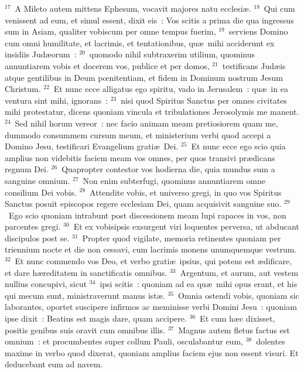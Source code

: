 ${}^{17}$~A Mileto autem mittens Ephesum, vocavit majores natu ecclesi\ae .
${}^{18}$~Qui cum venissent ad eum, et simul essent, dixit eis~: Vos scitis a prima die qua ingressus sum in Asiam, qualiter vobiscum per omne tempus fuerim,
${}^{19}$~serviens Domino cum omni humilitate, et lacrimis, et tentationibus, qu\ae\ mihi acciderunt ex insidiis Jud\ae orum~:
${}^{20}$~quomodo nihil subtraxerim utilium, quominus annuntiarem vobis et docerem vos, publice et per domos,
${}^{21}$~testificans Jud\ae is atque gentilibus in Deum pœnitentiam, et fidem in Dominum nostrum Jesum Christum.
${}^{22}$~Et nunc ecce alligatus ego spiritu, vado in Jerusalem~: qu\ae\ in ea ventura sint mihi, ignorans~:
${}^{23}$~nisi quod Spiritus Sanctus per omnes civitates mihi protestatur, dicens quoniam vincula et tribulationes Jerosolymis me manent.
${}^{24}$~Sed nihil horum vereor~: nec facio animam meam pretiosiorem quam me, dummodo consummem cursum meum, et ministerium verbi quod accepi a Domino Jesu, testificari Evangelium grati\ae\ Dei.
${}^{25}$~Et nunc ecce ego scio quia amplius non videbitis faciem meam vos omnes, per quos transivi pr\ae dicans regnum Dei.
${}^{26}$~Quapropter contestor vos hodierna die, quia mundus sum a sanguine omnium.
${}^{27}$~Non enim subterfugi, quominus annuntiarem omne consilium Dei vobis.
${}^{28}$~Attendite vobis, et universo gregi, in quo vos Spiritus Sanctus posuit episcopos regere ecclesiam Dei, quam acquisivit sanguine suo.
${}^{29}$~Ego scio quoniam intrabunt post discessionem meam lupi rapaces in vos, non parcentes gregi.
${}^{30}$~Et ex vobisipsis exsurgent viri loquentes perversa, ut abducant discipulos post se.
${}^{31}$~Propter quod vigilate, memoria retinentes quoniam per triennium nocte et die non cessavi, cum lacrimis monens unumquemque vestrum.
${}^{32}$~Et nunc commendo vos Deo, et verbo grati\ae\ ipsius, qui potens est \ae dificare, et dare h\ae reditatem in sanctificatis omnibus.
${}^{33}$~Argentum, et aurum, aut vestem nullius concupivi, sicut
${}^{34}$~ipsi scitis~: quoniam ad ea qu\ae\ mihi opus erant, et his qui mecum sunt, ministraverunt manus ist\ae .
${}^{35}$~Omnia ostendi vobis, quoniam sic laborantes, oportet suscipere infirmos ac meminisse verbi Domini Jesu~: quoniam ipse dixit~: Beatius est magis dare, quam accipere.
${}^{36}$~Et cum h\ae c dixisset, positis genibus suis oravit cum omnibus illis.
${}^{37}$~Magnus autem fletus factus est omnium~: et procumbentes super collum Pauli, osculabantur eum,
${}^{38}$~dolentes maxime in verbo quod dixerat, quoniam amplius faciem ejus non essent visuri. Et deducebant eum ad navem.
